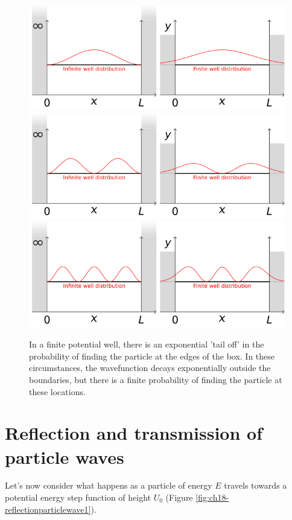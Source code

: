 \documentclass[
]{book}
\begin{document}
\begin{figure}

{\centering \includegraphics[width=0.7\linewidth]{visualisations/LaTeX/ch18-infinitefinite-well1} \includegraphics[width=0.7\linewidth]{visualisations/LaTeX/ch18-infinitefinite-well2} \includegraphics[width=0.7\linewidth]{visualisations/LaTeX/ch18-infinitefinite-well3} 

}

\caption{In a finite potential well, there is an exponential 'tail off' in the probability of finding the particle at the edges of the box. In these circumstances, the wavefunction decays exponentially outside the boundaries, but there is a finite probability of finding the particle at these locations.}\label{fig:ch18-finitewell1}
\end{figure}

\hypertarget{sec:ch18-reflectionparticlewaves}{%
\section{Reflection and transmission of particle waves}\label{sec:ch18-reflectionparticlewaves}}

Let's now consider what happens as a particle of energy \(E\) travels towards a potential energy step function of height \(U_0\) (Figure \ref{fig:ch18-reflectionparticlewave1}).
\end{document}
